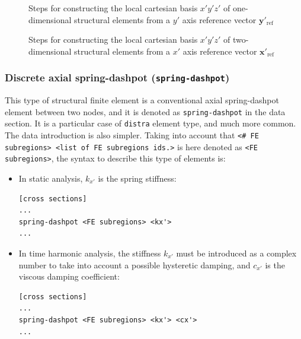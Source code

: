 \documentclass[a4paper,fleqn]{book}
\begin{document}
\begin{figure}[p]

\caption{Steps for constructing the local cartesian basis $x'y'z'$ of one-dimensional structural elements from a $y'$ axis reference vector $\mathbf{y}'_\mathrm{ref}$}
\label{fig:local_axes_yref_1d}
\end{figure}

\begin{figure}[p]

\caption{Steps for constructing the local cartesian basis $x'y'z'$ of two-dimensional structural elements from a $x'$ axis reference vector $\mathbf{x}'_\mathrm{ref}$}
\label{fig:local_axes_yref_2d}
\end{figure}

\subsubsection{Discrete axial spring-dashpot (\texttt{spring-dashpot})}

This type of structural finite element is a conventional axial spring-dashpot element between two nodes, and it is denoted as \texttt{spring-dashpot} in the data section. It is a particular case of \texttt{distra} element type, and much more common. The data introduction is also simpler. Taking into account that \texttt{<\# FE subregions> <list of FE subregions ids.>} is here denoted as \texttt{<FE subregions>}, the syntax to describe this type of elements is:
\begin{itemize}
\item In static analysis, $k_{x'}$ is the spring stiffness:
\begin{Verbatim}[frame=single, fontsize=\small, label={format of section [cross sections] for spring-dashpot elements}]
[cross sections]
...
spring-dashpot <FE subregions> <kx'>
...
\end{Verbatim} 

\item In time harmonic analysis, the stiffness $k_{x'}$ must be introduced as a complex number to take into account a possible hysteretic damping, and $c_{x'}$ is the viscous damping coefficient:
\begin{Verbatim}[frame=single, fontsize=\small, label={format of section [cross sections] for spring-dashpot elements}]
[cross sections]
...
spring-dashpot <FE subregions> <kx'> <cx'>
...
\end{Verbatim} 
\end{itemize}
\end{document}
